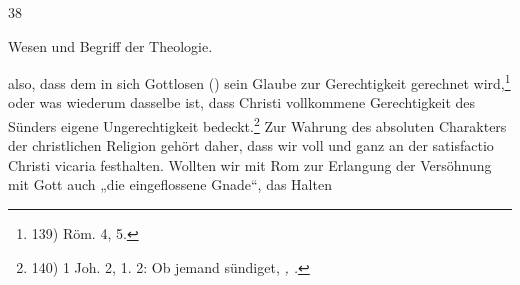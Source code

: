 \begin{center}
38

Wesen und Begriff der Theologie.
\end{center}
also, dass dem in sich Gottlosen (\textit{\textalpha\sigma\epsilon\beta\eta\varsigma}) sein Glaube zur Gerechtigkeit gerechnet wird,\footnote{139) Röm. 4, 5.}
oder was wiederum dasselbe ist, dass Christi vollkommene Gerechtigkeit des Sünders eigene Ungerechtigkeit bedeckt.\footnote{140) 1 Joh. 2, 1. 2: Ob jemand sündiget, \textit{\textpi\alpha\rho\alpha\kappa\lambda\eta\tau\omicron\nu \epsilon\chi\omicron\mu\epsilon\nu \pi\rho\omicron\varsigma \tau\omicron\nu \pi\alpha\tau\epsilon\rho\alpha, \textiota\eta\sigma\omicron\upsilon\nu \Chi\rho\iota\sigma\tau\omicron\nu \delta\iota\kappa\alpha\iota\omicron\nu.}}
Zur Wahrung des absoluten Charakters der christlichen Religion gehört daher, dass wir voll und ganz an der satisfactio Christi vicaria festhalten. Wollten wir mit Rom zur Erlangung der Versöhnung mit Gott auch „die eingeflossene Gnade“, das Halten

